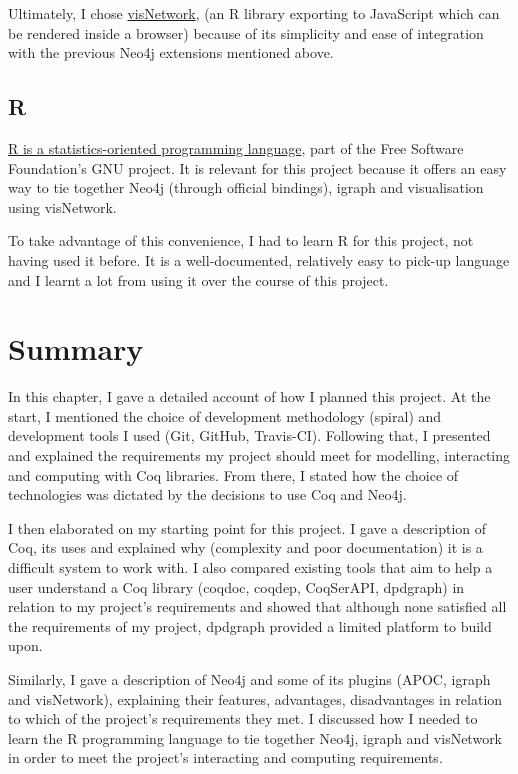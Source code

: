 Ultimately, I chose
\href{http://datastorm-open.github.io/visNetwork}{visNetwork}, (an R library
exporting to JavaScript which can be rendered inside a browser) because of its
simplicity and ease of integration with the previous Neo4j extensions mentioned
above.

\subsection{R}\label{subsec:R}

\href{http://www.r-project.org}{R is a statistics-oriented programming
language}, part of the Free Software Foundation's GNU project. It is relevant for
this project because it offers an easy way to tie together Neo4j (through
official bindings), igraph and visualisation using visNetwork.

To take advantage of this convenience, I had to learn R for this project, not
having used it before. It is a well-documented, relatively easy to pick-up
language and I learnt a lot from using it over the course of this project.

\newpage
\section{Summary}

In this chapter, I gave a detailed account of how I planned this project. At the
start, I mentioned the choice of development methodology (spiral) and
development tools I used (Git, GitHub, Travis-CI). Following that, I presented
and explained the requirements my project should meet for modelling, interacting
and computing with Coq libraries. From there, I stated how the choice of
technologies was dictated by the decisions to use Coq and Neo4j.

I then elaborated on my starting point for this project. I gave a description of
Coq, its uses and explained why (complexity and poor documentation) it is a
difficult system to work with. I also compared existing tools that aim to help a
user understand a Coq library (coqdoc, coqdep, CoqSerAPI, dpdgraph) in relation
to my project's requirements and showed that although none satisfied all the
requirements of my project, dpdgraph provided a limited platform to build upon.

Similarly, I gave a description of Neo4j and some of its plugins (APOC, igraph
and visNetwork), explaining their features, advantages, disadvantages in
relation to which of the project's requirements they met. I discussed how I
needed to learn the R programming language to tie together Neo4j, igraph and
visNetwork in order to meet the project's interacting and computing
requirements.

